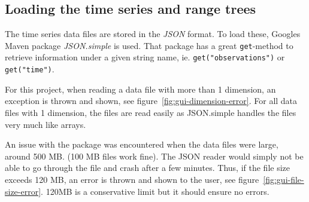 \subsection{Loading the time series and range trees} \label{sec:loading-time-series}

The time series data files are stored in the \textit{JSON} format. To load
these, Googles Maven package \textit{JSON.simple} is used. That package has a
great \texttt{get}-method to retrieve information under a given string name, ie.
\texttt{get("observations")} or \texttt{get("time")}. 

For this project, when reading a data file with more than 1 dimension, an
exception is thrown and shown, see figure~\ref{fig:gui-dimension-error}.
For all data files with 1 dimension, the files are read
easily as JSON.simple handles the files very much like arrays. 

An issue with the package was encountered when the data files were large, around
500 MB. (100 MB files work fine). The JSON reader would simply not be able to go
through the file and crash after a few minutes. Thus, if the file size exceeds
120 MB, an error is thrown and shown to the user,
see figure~\ref{fig:gui-file-size-error}. 120MB is a conservative limit but
it should ensure no errors. 

